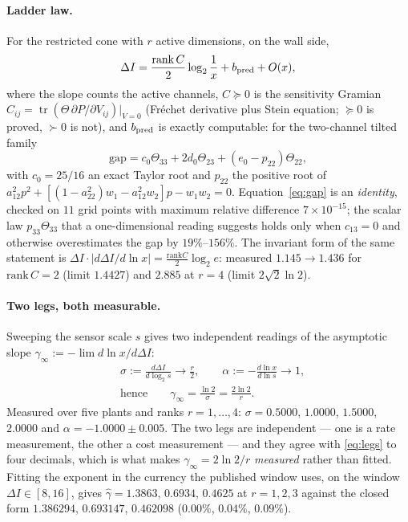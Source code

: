 \paragraph{Ladder law.} For the restricted cone with $r$ active dimensions, on the
wall side,
\begin{equation}
  \Delta I=\frac{\mathrm{rank}\,C}{2}\log_2\frac1x+b_{\rm pred}+O(x),
  \label{eq:ladder}
\end{equation}
where the slope counts the active channels, $C\succeq0$ is the sensitivity Gramian
$C_{ij}=\operatorname{tr}(\Theta\,\partial P/\partial V_{ij})|_{V=0}$ (Fréchet
derivative plus Stein equation; $\succeq0$ is proved, $\succ0$ is not), and
$b_{\rm pred}$ is exactly computable: for the two-channel tilted family
\begin{equation}
  \mathrm{gap}=c_0\Theta_{33}+2d_0\Theta_{23}+(e_0-p_{22})\Theta_{22},
  \label{eq:gap}
\end{equation}
with $c_0=25/16$ an exact Taylor root and $p_{22}$ the positive root of
$a_{12}^2p^2+[(1-a_{22}^2)w_1-a_{12}^2w_2]p-w_1w_2=0$. Equation~\eqref{eq:gap} is an
\emph{identity}, checked on $11$ grid points with maximum relative difference
$7\times10^{-15}$; the scalar law $p_{33}\Theta_{33}$ that a one-dimensional
reading suggests holds only when $c_{13}=0$ and otherwise overestimates the gap by
$19\%$--$156\%$. The invariant form of the same statement is
$\Delta I\cdot|d\Delta I/d\ln x|=\frac{\mathrm{rank}C}{2}\log_2e$: measured
$1.145\to1.436$ for $\mathrm{rank}\,C=2$ (limit $1.4427$) and $2.885$ at $r=4$
(limit $2\sqrt{2}\ln2$).

\paragraph{Two legs, both measurable.} Sweeping the sensor scale $s$ gives two
independent readings of the asymptotic slope
$\gamma_\infty:=-\lim d\ln x/d\Delta I$:
\begin{equation}
  \begin{aligned}
  &\sigma:=\frac{d\Delta I}{d\log_2s}\longrightarrow\frac r2,
   \qquad
   \alpha:=-\frac{d\ln x}{d\ln s}\longrightarrow1,\\
  &\text{hence}\qquad \gamma_\infty=\frac{\ln2}{\sigma}=\frac{2\ln2}{r}.
  \end{aligned}
  \label{eq:legs}
\end{equation}
Measured over five plants and ranks $r=1,\dots,4$: $\sigma=0.5000$, $1.0000$,
$1.5000$, $2.0000$ and $\alpha=-1.0000\pm0.005$. The two legs are independent ---
one is a rate measurement, the other a cost measurement --- and they agree with
\eqref{eq:legs} to four decimals, which is what makes $\gamma_\infty=2\ln2/r$
\emph{measured} rather than fitted. Fitting the exponent in the currency the
published window uses, on the window $\Delta I\in[8,16]$, gives
$\hat\gamma=1.3863$, $0.6934$, $0.4625$ at $r=1,2,3$ against the closed form
$1.386294$, $0.693147$, $0.462098$ ($0.00\%$, $0.04\%$, $0.09\%$).


